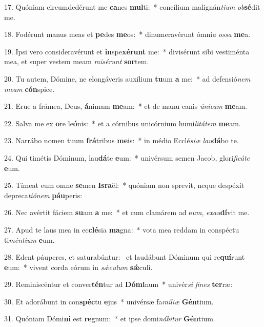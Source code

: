 17. Quóniam circumdedérunt me \textbf{ca}nes \textbf{mul}ti:~*  concílium malignán\textit{ti}\textit{um} \textit{ob}\textbf{sé}dit me.\

18. Fodérunt manus meas et \textbf{pe}des \textbf{me}os:~*  dinumeravérunt ómni\textit{a} \textit{os}\textit{sa} \textbf{me}a.\

19. Ipsi vero consideravérunt et \textbf{in}spe\textbf{xé}\textbf{runt} me:~*  divisérunt sibi vestiménta mea, et super vestem meam \textit{mi}\textit{sé}\textit{runt} \textbf{sor}tem.\

20. Tu autem, Dómine, ne elongáveris auxílium \textbf{tu}um \textbf{a} me:~*  ad defensió\textit{nem} \textit{me}\textit{am} \textbf{cón}spice.\

21. Erue a frámea, Deus, \textbf{á}nimam \textbf{me}am:~*  et de manu canis \textit{ú}\textit{ni}\textit{cam} \textbf{me}am.\

22. Salva me ex \textbf{o}re le\textbf{ó}nis:~*  et a córnibus unicórnium humi\textit{li}\textit{tá}\textit{tem} \textbf{me}am.\

23. Narrábo nomen tuum \textbf{frá}tribus \textbf{me}is:~*  in médio Ecclé\textit{si}\textit{æ} \textit{lau}\textbf{dá}bo te.\

24. Qui timétis Dóminum, lau\textbf{dá}te \textbf{e}um:~*  univérsum semen Jacob, glori\textit{fi}\textit{cá}\textit{te} \textbf{e}um.\

25. Tímeat eum omne \textbf{se}men \textbf{Is}\textbf{ra}ël:~*  quóniam non sprevit, neque despéxit depreca\textit{ti}\textit{ó}\textit{nem} \textbf{páu}peris:\

26. Nec avértit fáciem \textbf{su}am \textbf{a} me:~*  et cum clamárem ad e\textit{um}, \textit{ex}\textit{au}\textbf{dí}vit me.\

27. Apud te laus mea in ec\textbf{clé}sia \textbf{ma}gna:~*  vota mea reddam in conspéctu ti\textit{mén}\textit{ti}\textit{um} \textbf{e}um.\

28. Edent páuperes, et saturabúntur: \dag\  et laudábunt Dóminum qui re\textbf{quí}runt \textbf{e}um:~*  vivent corda eórum in \textit{sǽ}\textit{cu}\textit{lum} \textbf{sǽ}culi.\

29. Reminiscéntur et conver\textbf{tén}tur ad \textbf{Dó}\textbf{mi}num~*  univér\textit{si} \textit{fi}\textit{nes} \textbf{ter}ræ:\

30. Et adorábunt in con\textbf{spéc}tu \textbf{e}jus~*  univérsæ fa\textit{mí}\textit{li}\textit{æ} \textbf{Gén}tium.\

31. Quóniam Dómi\textbf{ni} est \textbf{re}gnum:~*  et ipse domi\textit{ná}\textit{bi}\textit{tur} \textbf{Gén}tium.\

